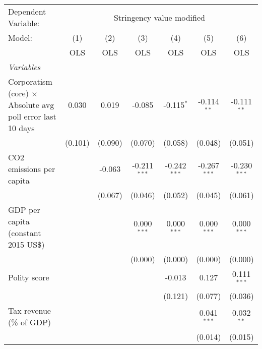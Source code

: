 
\begingroup
\centering
\begin{tabular}{lcccccc}
   \toprule
   Dependent Variable: & \multicolumn{6}{c}{Stringency value modified}\\
   Model:                                                            & (1)     & (2)     & (3)            & (4)            & (5)            & (6)\\  
                                                                     &  OLS    & OLS     & OLS            & OLS            & OLS            & OLS\\  
   \midrule
   \emph{Variables}\\
   Corporatism (core) $\times$ Absolute avg poll error last 10 days  & 0.030   & 0.019   & -0.085         & -0.115$^{*}$   & -0.114$^{**}$  & -0.111$^{**}$\\   
                                                                     & (0.101) & (0.090) & (0.070)        & (0.058)        & (0.048)        & (0.051)\\   
   CO2 emissions per capita                                          &         & -0.063  & -0.211$^{***}$ & -0.242$^{***}$ & -0.267$^{***}$ & -0.230$^{***}$\\   
                                                                     &         & (0.067) & (0.046)        & (0.052)        & (0.045)        & (0.061)\\   
   GDP per capita (constant 2015 US\$)                               &         &         & 0.000$^{***}$  & 0.000$^{***}$  & 0.000$^{***}$  & 0.000$^{***}$\\   
                                                                     &         &         & (0.000)        & (0.000)        & (0.000)        & (0.000)\\   
   Polity score                                                      &         &         &                & -0.013         & 0.127          & 0.111$^{***}$\\   
                                                                     &         &         &                & (0.121)        & (0.077)        & (0.036)\\   
   Tax revenue (\% of GDP)                                           &         &         &                &                & 0.041$^{***}$  & 0.032$^{**}$\\   
                                                                     &         &         &                &                & (0.014)        & (0.015)\\   

\end{tabular}
